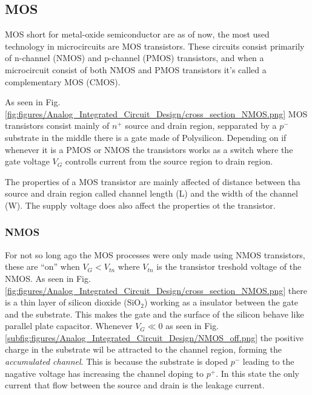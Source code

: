 \subsection{MOS}
MOS short for metal-oxide semiconductor are as of now, the most used technology in microcircuits are MOS transistors. These circuits consist primarily of n-channel (NMOS) and p-channel (PMOS) transistors, and when a microcircuit consist of both NMOS and PMOS transistors it's called a complementary MOS (CMOS).\cite[p. 14]{carusone_2012_analog}



As seen in Fig. \ref{fig:figures/Analog_Integrated_Circuit_Design/cross_section_NMOS.png} MOS transistors consist mainly of $n^+$ source and drain region, sepparated by a $p^-$ substrate in the middle there is a gate made of Polysilicon. Depending on if whenever it is a PMOS or NMOS the transistors works as a switch where the gate voltage $V_G$ controlls current from the source region to drain region. 

The properties of a MOS transistor are mainly affected of distance between tha source and drain region called channel length (L) and the width of the channel (W). The supply voltage does also affect the properties ot the transistor. 



\subsubsection{NMOS}
For not so long ago the MOS processes were only made using NMOS transistors, these are ``on'' when $V_G < V_{tn}$ where $V_{tn}$ is the transistor treshold voltage of the NMOS. As seen in Fig. \ref{fig:figures/Analog_Integrated_Circuit_Design/cross_section_NMOS.png} there is a thin layer of silicon dioxide ($\text{SiO}_2$) working as a insulator between the gate and the substrate. This makes the gate and the surface of the silicon behave like parallel plate capacitor. Whenever $V_G\ll0$ as seen in Fig. \ref{subfig:figures/Analog_Integrated_Circuit_Design/NMOS_off.png} the positive charge in the substrate wil be attracted to the channel region, forming the \textit{accumulated channel}. This is because the substrate is doped $p^-$ leading to the nagative voltage has increasing the channel doping to $p^+$. In this state the only current that flow between the source and drain is the leakage current.

